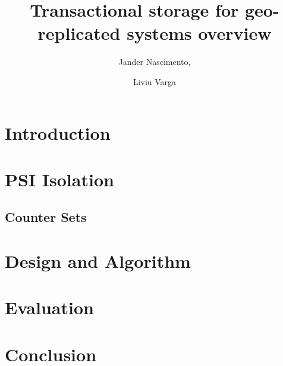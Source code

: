 \documentclass{article}
\begin{document}
\title{Transactional storage for geo-replicated systems overview}

\author{Jander Nascimento,
\and Liviu Varga}

\maketitle

\tableofcontents


\section{Introduction}          
\section{PSI Isolation}
\subsection{Counter Sets}



\section{Design and Algorithm}
\section{Evaluation}


\section{Conclusion}
\end{document}
